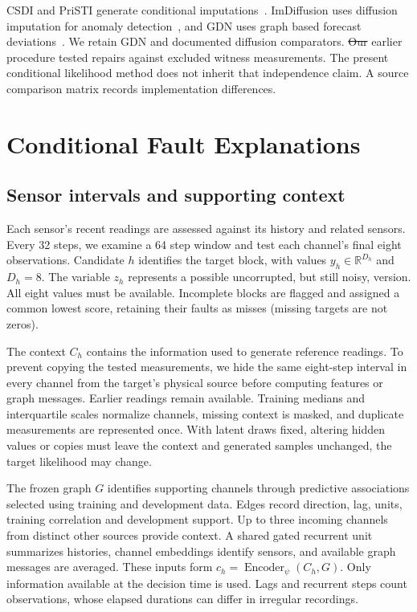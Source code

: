 \documentclass{llncs}
\newcommand{\1}{\mathbf{1}}
\providecommand{\DIFaddtex}[1]{{\protect\color{blue}\uwave{#1}}} %
\providecommand{\DIFdeltex}[1]{{\protect\color{red}\sout{#1}}}                      %
\providecommand{\DIFaddbegin}{} %
\providecommand{\DIFaddend}{} %
\providecommand{\DIFdelbegin}{} %
\providecommand{\DIFdelend}{} %
\providecommand{\DIFadd}[1]{\texorpdfstring{\DIFaddtex{#1}}{#1}} %
\providecommand{\DIFdel}[1]{\texorpdfstring{\DIFdeltex{#1}}{}} %
\begin{document}
CSDI and PriSTI generate conditional imputations~\cite{csdi,pristi}. ImDiffusion uses diffusion imputation for anomaly detection~\cite{imdiffusion}, and GDN uses graph based forecast deviations~\cite{gdn}. We retain GDN and documented diffusion comparators. \DIFdelbegin \DIFdel{Our }\DIFdelend \DIFaddbegin \DIFadd{The }\DIFaddend earlier procedure tested repairs against excluded witness measurements. The present conditional likelihood method does not inherit that independence claim. A source comparison matrix records implementation differences.





\section{Conditional Fault Explanations}

\subsection{Sensor intervals and supporting context}
Each sensor's recent readings are assessed against its history and related sensors. Every 32 steps, we examine a 64 step window and test each channel's final eight observations. Candidate $h$ identifies the target block, with values $y_h\in\mathbb R^{D_h}$ and $D_h=8$. The variable $z_h$ represents a possible uncorrupted, but still noisy, version. All eight values must be available. Incomplete blocks are flagged and assigned a common lowest score, retaining their faults as misses (missing targets are not zeros).

The context $C_h$ contains the information used to generate reference readings. To prevent copying the tested measurements, we hide the same eight-step interval in every channel from the target's physical source before computing features or graph messages. Earlier readings remain available. Training medians and interquartile scales normalize channels, missing context is masked, and duplicate measurements are represented once. With latent draws fixed, altering hidden values or copies must leave the context and generated samples unchanged, the target likelihood may change.

The frozen graph $G$ identifies supporting channels through predictive associations selected using training and development data. Edges record direction, lag, units, training correlation and development support. Up to three incoming channels from distinct other sources provide context. A shared gated recurrent unit summarizes histories, channel embeddings identify sensors, and available graph messages are averaged. These inputs form $c_h=\operatorname{Encoder}_{\psi}(C_h,G)$. Only information available at the decision time is used. Lags and recurrent steps count observations, whose elapsed durations can differ in irregular recordings.
\end{document}
